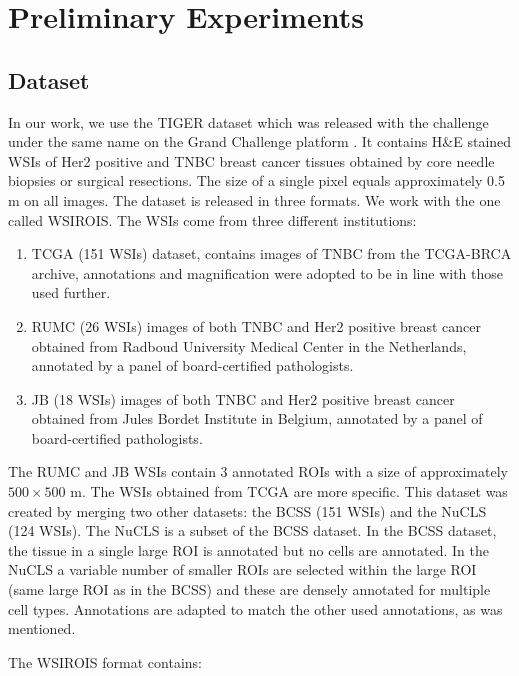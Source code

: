 \chapter{Preliminary Experiments}
\label{chap:prelim-exp}

\section{Dataset}
In our work, we use the TIGER dataset which was released with the challenge under the same name on the Grand Challenge platform \cite{tiger_dataset}. It contains H\&E stained WSIs of Her2 positive and TNBC breast cancer tissues obtained by core needle biopsies or surgical resections. The size of a single pixel equals approximately 0.5 \textmu m on all images. The dataset is released in three formats. We work with the one called WSIROIS. The WSIs come from three different institutions:

\begin{enumerate}
    \item TCGA (151 WSIs) dataset, contains images of TNBC from the TCGA-BRCA archive, annotations and magnification were adopted to be in line with those used further.
    \item RUMC (26 WSIs) images of both TNBC and Her2 positive breast cancer obtained from Radboud University Medical Center in the Netherlands, annotated by a panel of board-certified pathologists.
    \item JB (18 WSIs) images of both TNBC and Her2 positive breast cancer obtained from Jules Bordet Institute in Belgium, annotated by a panel of board-certified pathologists.
\end{enumerate}

The RUMC and JB WSIs contain 3 annotated ROIs with a size of approximately $500\!\times\!500$ \textmu m. The WSIs obtained from TCGA are more specific. This dataset was created by merging two other datasets: the BCSS (151 WSIs) and the NuCLS (124 WSIs). The NuCLS is a subset of the BCSS dataset. In the BCSS dataset, the tissue in a single large ROI is annotated but no cells are annotated. In the NuCLS a variable number of smaller ROIs are selected within the large ROI (same large ROI as in the BCSS) and these are densely annotated for multiple cell types. Annotations are adapted to match the other used annotations, as was mentioned.

The WSIROIS format contains:

